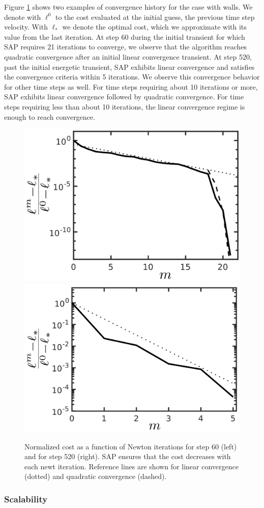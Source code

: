 Figure \ref{fig:clutter_line_search} shows two examples of convergence history
for the case with walls. We denote with $\ell^0$ to the cost evaluated at the
initial guess, the previous time step velocity. With $\ell_*$ we denote the
optimal cost, which we approximate with its value from the last iteration. At
step 60 during the initial transient for which SAP requires 21 iterations to
converge, we observe that the algorithm reaches quadratic convergence after an
initial linear convergence transient. At step 520, past the initial energetic
transient, SAP exhibits linear convergence and satisfies the convergence
criteria within 5 iterations. We observe this convergence behavior for other
time steps as well. For time steps requiring about 10 iterations or more, SAP
exhibits linear convergence followed by quadratic convergence. For time steps
requiring less than about 10 iterations, the linear convergence regime is enough
to reach convergence.
\begin{figure}[!h]
	\centering
    \includegraphics[height=0.34\columnwidth]{figures/clutter/normalized_cost_step60_21its_wwalls_latex_labels.png}
	\includegraphics[height=0.34\columnwidth]{figures/clutter/normalized_cost_step520_5its_wwalls_latex_labels.png}    
	\caption{\label{fig:clutter_line_search} 
	Normalized cost as a function of Newton iterations for step 60 (left) and for step 520 (right). SAP ensures that the cost decreases with each newt iteration. Reference lines are shown for linear convergence (dotted) and quadratic convergence (dashed).}
\end{figure}

\subsubsection{Scalability}

